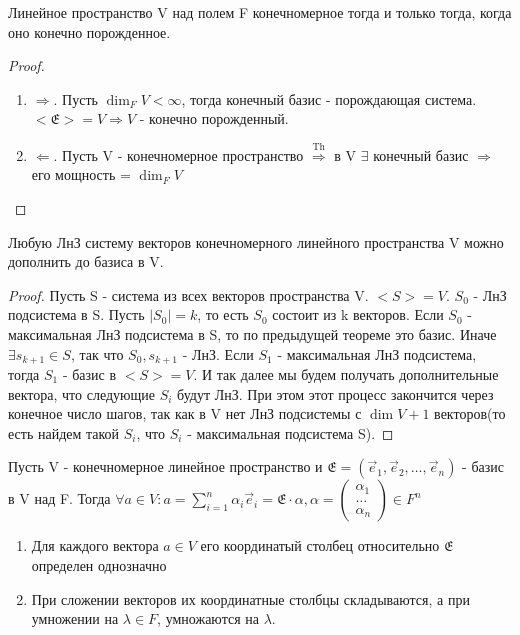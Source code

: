 \begin{corollary}
	Линейное пространство V над полем F конечномерное тогда и только тогда, когда оно конечно порожденное.
\end{corollary}
\begin{proof}
	\begin{enumerate}
		\item \(\Longrightarrow\). Пусть \(\dim_FV < \infty\), тогда конечный базис - порождающая система. \(<\mathfrak{E}>=V\Longrightarrow V\) - конечно порожденный.
		\item \(\Longleftarrow\). Пусть V - конечномерное пространство \(\overset{\text{Th}}{\Longrightarrow}\) в V \(\exists\) конечный базис $\Longrightarrow$ его мощность = \(\dim_FV\)
	\end{enumerate}
\end{proof}
\begin{theorem}
	Любую ЛнЗ систему векторов конечномерного линейного пространства V можно дополнить до базиса в V.
\end{theorem}
\begin{proof}
	Пусть S - система из всех векторов пространства V. \(<S> = V\). \(S_0\) - ЛнЗ подсистема в S. Пусть \(|S_0| = k\), то есть \(S_0\) состоит из k векторов. Если \(S_0\) - максимальная ЛнЗ подсистема в S, то по предыдущей теореме это базис. Иначе \(\exists s_{k+1}\in S\), так что \(S_0, s_{k+1}\) - ЛнЗ. Если \(S_1\) - максимальная ЛнЗ подсистема, тогда \(S_1\) - базис в \(<S> = V\). И так далее мы будем получать дополнительные вектора, что следующие \(S_i\) будут ЛнЗ. При этом этот процесс закончится через конечное число шагов, так как в V нет ЛнЗ подсистемы с \(\dim V+1\) векторов(то есть найдем такой \(S_i\), что \(S_i\) - максимальная подсистема S).
\end{proof}
Пусть V - конечномерное линейное пространство и \(\mathfrak{E} = (\vec e_1, \vec e_2, \ldots, \vec e_n)\) - базис в V над F. Тогда \(\forall a\in V: a=\sum_{i=1}^{n}\alpha_i\vec e_i = \mathfrak{E}\cdot\alpha, \alpha = \begin{pmatrix}
\alpha_1 \\ \ldots \\\alpha_n
\end{pmatrix}\in F^n\)
\begin{proposition}
	\begin{enumerate}
		\item Для каждого вектора \(a\in V\) его координатый столбец относительно \(\mathfrak{E}\) определен однозначно
		\item При сложении векторов их координатные столбцы складываются, а при умножении на $\lambda\in F$, умножаются на $\lambda$.
	\end{enumerate}
\end{proposition}
